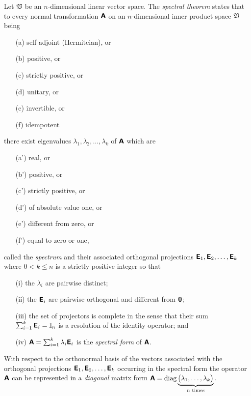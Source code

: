 Let $\frak V$ be an $n$-dimensional linear vector space.
The {\em spectral theorem} states
that to every normal transformation $ \textsf{\textbf{A}} $ on an $n$-dimensional inner product space $\frak V$
being
\begin{itemize}
\item[(a)] self-adjoint (Hermiteian), or
\item[(b)] positive, or
\item[(c)] strictly positive, or
\item[(d)] unitary, or
\item[(e)] invertible, or
\item[(f)] idempotent
\end{itemize}
there exist eigenvalues $
\lambda_1,
\lambda_2, \ldots ,
\lambda_k
$ of   $ \textsf{\textbf{A}}$
which are
\begin{itemize}
\item[(a')] real, or
\item[(b')] positive, or
\item[(c')] strictly positive, or
\item[(d')] of absolute value one, or
\item[(e')] different from zero, or
\item[(f')] equal to zero or one,
\end{itemize}
called the {\em spectrum}
and their associated  orthogonal projections
$
\textsf{\textbf{E}}_1,
\textsf{\textbf{E}}_2, \ldots ,
\textsf{\textbf{E}}_k
$
where $0<k\le n$ is a strictly positive integer so that
\begin{itemize}
\item[(i)]
the $\lambda_i$ are pairwise distinct;
\item[(ii)]
the $\textsf{\textbf{E}}_i$ are pairwise orthogonal and different from $\textsf{\textbf{0}}$;
\item[(iii)]
the set of projectors is complete in the sense that their
sum $\sum_{i=1}^k \textsf{\textbf{E}}_i={\Bbb I}_n$
is a resolution of the identity operator; and
\item[(iv)]
$
\textsf{\textbf{A}}=\sum_{i=1}^k \lambda_i\textsf{\textbf{E}}_i
$
is the {\em spectral form} of $\textsf{\textbf{A}}$.
\end{itemize}

With respect to the orthonormal basis of the vectors associated with the orthogonal projections  $
\textsf{\textbf{E}}_1,
\textsf{\textbf{E}}_2, \ldots ,
\textsf{\textbf{E}}_k
$  occurring in the spectral form the operator
$\textsf{\textbf{A}}$ can be represented
in a {\em diagonal} matrix form $
\textsf{\textbf{A}}= \text{diag}\underbrace{\begin{pmatrix}\lambda_1,\ldots,\lambda_k\end{pmatrix}}_{n\text{ times}}
$.

